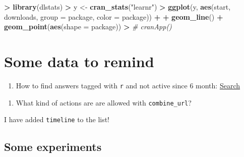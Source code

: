 \documentclass[]{book}
\newenvironment{Shaded}{\begin{snugshade}}{\end{snugshade}}
\newcommand{\KeywordTok}[1]{\textcolor[rgb]{0.13,0.29,0.53}{\textbf{#1}}}
\newcommand{\DataTypeTok}[1]{\textcolor[rgb]{0.13,0.29,0.53}{#1}}
\newcommand{\StringTok}[1]{\textcolor[rgb]{0.31,0.60,0.02}{#1}}
\newcommand{\CommentTok}[1]{\textcolor[rgb]{0.56,0.35,0.01}{\textit{#1}}}
\newcommand{\OperatorTok}[1]{\textcolor[rgb]{0.81,0.36,0.00}{\textbf{#1}}}
\newcommand{\NormalTok}[1]{#1}
\providecommand{\tightlist}{%
  \setlength{\itemsep}{0pt}\setlength{\parskip}{0pt}}
\theoremstyle{definition}
\theoremstyle{definition}
\theoremstyle{definition}
\theoremstyle{remark}
\begin{document}
\begin{Shaded}
\begin{Highlighting}[]
\OperatorTok{>}\StringTok{ }\KeywordTok{library}\NormalTok{(dlstats)}
\OperatorTok{>}\StringTok{ }\NormalTok{y <-}\StringTok{ }\KeywordTok{cran_stats}\NormalTok{(}\StringTok{"learnr"}\NormalTok{)}
\OperatorTok{>}\StringTok{ }\KeywordTok{ggplot}\NormalTok{(y, }\KeywordTok{aes}\NormalTok{(start, downloads, }\DataTypeTok{group =}\NormalTok{ package, }\DataTypeTok{color =}\NormalTok{ package)) }\OperatorTok{+}
\OperatorTok{+}\StringTok{         }\KeywordTok{geom_line}\NormalTok{() }\OperatorTok{+}\StringTok{ }\KeywordTok{geom_point}\NormalTok{(}\KeywordTok{aes}\NormalTok{(}\DataTypeTok{shape =}\NormalTok{ package))}
\OperatorTok{>}\StringTok{ }\CommentTok{# cranApp()}
\end{Highlighting}
\end{Shaded}

\section{Some data to remind}\label{some-data-to-remind}

\begin{enumerate}
\def\labelenumi{\arabic{enumi}.}
\tightlist
\item
  How to find answers tagged with \texttt{r} and not active since 6
  month:
  \href{https://stackoverflow.com/search?q=\%5Br\%5D+lastactive\%3A..6m+is\%3Aa}{Search}
\end{enumerate}

\begin{enumerate}
\def\labelenumi{\arabic{enumi}.}
\setcounter{enumi}{2}
\tightlist
\item
  What kind of actions are are allowed with \texttt{combine\_url}?
\end{enumerate}

I have added \texttt{timeline} to the list!

\subsection{Some experiments}\label{some-experiments}
\end{document}
